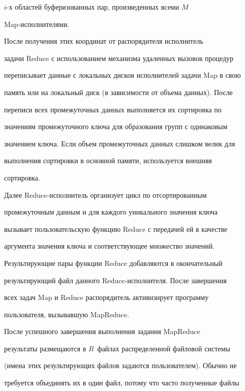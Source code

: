       $i$-х областей буферизованных пар, произведенных всеми $M$ 


Map-ис\-пол\-ни\-те\-лями. 


      


      После получения этих координат от распорядителя исполнитель 


задачи Reduce с использованием механизма удаленных вызовов процедур 


переписывает данные с локальных дисков исполнителей задачи Map в свою 


память или на локальный диск (в зависимости от объема данных). После 


переписи всех промежуточных данных выполняется их сортировка по 


значениям промежуточного ключа для образования групп с одинаковым 


значением ключа. Если объем промежуточных данных слишком велик для 


выполнения сортировки в основной памяти, используется внешняя 


сортировка. 


      


      Далее Reduce-исполнитель организует цикл по отсортированным 


промежуточным данным и для каждого уникального значения ключа 


вызывает пользовательскую функцию Reduce с передачей ей в качестве 


аргумента значения ключа и соответствующее множество значений. 


Результирующие пары функции Reduce добавляются в окончательный 


результирующий файл данного Reduce-ис\-пол\-ни\-те\-ля. После завершения 


всех задач Map и Reduce распорядитель активизирует программу 


пользователя, вызывавшую MapReduce. 


      


      После успешного завершения выполнения задания MapReduce 


результаты размещаются в $R$~файлах распределенной файловой системы 


(имена этих результирующих файлов задаются пользователем). Обычно не 


требуется объединять их в один файл, потому что часто полученные файлы 


